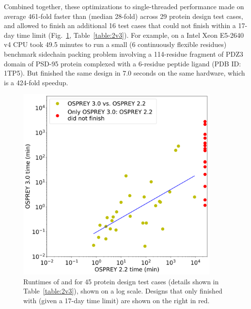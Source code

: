 Combined together, these optimizations to single-threaded performance made  on average 461-fold faster than  (median 28-fold) across 29 protein design test cases, and allowed  to finish an additional 16 test cases that  could not finish within a 17-day time limit (Fig.~\ref{fig:2v3}, Table~\ref{table:2v3}).  For example,  on a Intel Xeon E5-2640 v4 CPU took 49.5 minutes to run a small (6 continuously flexible residues) benchmark sidechain packing problem involving a 114-residue fragment of PDZ3 domain of PSD-95 protein complexed with a 6-residue peptide ligand (PDB ID: 1TP5).  But  finished the same design in 7.0 seconds on the same hardware, which is a 424-fold speedup.  

\begin{figure}
\center
\includegraphics[width=4in]{figures/2v3_times.png}
\caption{Runtimes of  and  for 45 protein design test cases (details shown in Table~\ref{table:2v3}), shown on a log scale. Designs that only finished with  (given a 17-day time limit) are shown on the right in red.}
\label{fig:2v3}
\end{figure}

